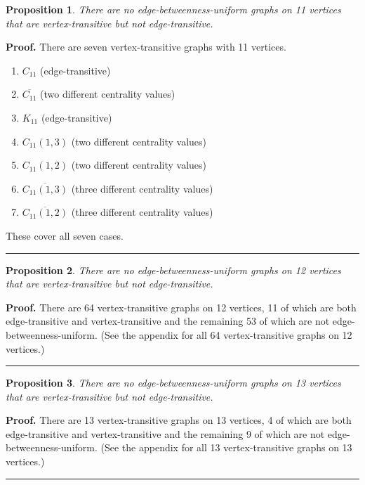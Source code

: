 \documentclass{article}%
\newtheorem{proposition}{Proposition}[section]
\newenvironment{proof}[1][Proof]{\textbf{#1.} }{\ \rule{0.5em}{0.5em}}
\begin{document}
\begin{proposition}
There are no edge-betweenness-uniform graphs on 11 vertices that are
vertex-transitive but not edge-transitive.
\end{proposition}

\begin{proof}
There are seven vertex-transitive graphs with 11 vertices.

\begin{enumerate}
\item $C_{11}$ (edge-transitive)

\item $\overline{C_{11}}$ (two different centrality values)

\item $K_{11}$ (edge-transitive)

\item $C_{11}(1,3)$ (two different centrality values)

\item $C_{11}(1,2)$ (two different centrality values)

\item $\overline{C_{11}(1,3)}$ (three different centrality values)

\item $\overline{C_{11}(1,2)}$ (three different centrality values)
\end{enumerate}

These cover all seven cases.
\end{proof}

\begin{proposition}
There are no edge-betweenness-uniform graphs on 12 vertices that are
vertex-transitive but not edge-transitive.
\end{proposition}

\begin{proof}
There are 64 vertex-transitive graphs on 12 vertices, 11 of which are both
edge-transitive and vertex-transitive and the remaining 53 of which are not
edge-betweenness-uniform. (See the appendix for all 64 vertex-transitive
graphs on 12 vertices.)
\end{proof}

\begin{proposition}
There are no edge-betweenness-uniform graphs on 13 vertices that are
vertex-transitive but not edge-transitive.
\end{proposition}

\begin{proof}
There are 13 vertex-transitive graphs on 13 vertices, 4 of which are both
edge-transitive and vertex-transitive and the remaining 9 of which are not
edge-betweenness-uniform. (See the appendix for all 13 vertex-transitive
graphs on 13 vertices.)
\end{proof}
\end{document}
